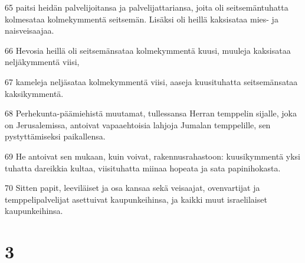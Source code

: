 \par 65 paitsi heidän palvelijoitansa ja palvelijattariansa, joita oli seitsemäntuhatta kolmesataa kolmekymmentä seitsemän. Lisäksi oli heillä kaksisataa mies- ja naisveisaajaa.
\par 66 Hevosia heillä oli seitsemänsataa kolmekymmentä kuusi, muuleja kaksisataa neljäkymmentä viisi,
\par 67 kameleja neljäsataa kolmekymmentä viisi, aaseja kuusituhatta seitsemänsataa kaksikymmentä.
\par 68 Perhekunta-päämiehistä muutamat, tullessansa Herran temppelin sijalle, joka on Jerusalemissa, antoivat vapaaehtoisia lahjoja Jumalan temppelille, sen pystyttämiseksi paikallensa.
\par 69 He antoivat sen mukaan, kuin voivat, rakennusrahastoon: kuusikymmentä yksi tuhatta dareikkia kultaa, viisituhatta miinaa hopeata ja sata papinihokasta.
\par 70 Sitten papit, leeviläiset ja osa kansaa sekä veisaajat, ovenvartijat ja temppelipalvelijat asettuivat kaupunkeihinsa, ja kaikki muut israelilaiset kaupunkeihinsa.

\chapter{3}

